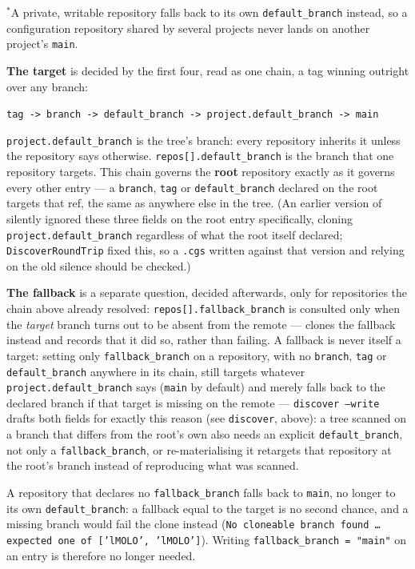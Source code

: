 ${}^{*}$A private, writable repository falls back to its own
\texttt{default\_branch} instead, so a configuration repository shared by
several projects never lands on another project's \texttt{main}.

\textbf{The target} is decided by the first four, read as one chain, a tag
winning outright over any branch:

\begin{center}
\texttt{tag -> branch -> default\_branch -> project.default\_branch -> main}
\end{center}

\texttt{project.default\_branch} is the tree's branch: every repository
inherits it unless the repository says otherwise.
\texttt{repos[].default\_branch} is the branch that one repository targets.
This chain governs the \textbf{root} repository exactly as it governs every
other entry --- a \texttt{branch}, \texttt{tag} or \texttt{default\_branch}
declared on the root targets that ref, the same as anywhere else in the
tree. (An earlier version of \cgscli{} silently ignored these three fields
on the root entry specifically, cloning \texttt{project.default\_branch}
regardless of what the root itself declared; \texttt{DiscoverRoundTrip}
fixed this, so a \texttt{.cgs} written against that version and relying on
the old silence should be checked.)

\textbf{The fallback} is a separate question, decided afterwards, only for
repositories the chain above already resolved: \texttt{repos[].fallback\_branch}
is consulted only when the \emph{target} branch turns out to be absent from
the remote --- \cgscli{} clones the fallback instead and records that it
did so, rather than failing. A fallback is never itself a target: setting
only \texttt{fallback\_branch} on a repository, with no \texttt{branch},
\texttt{tag} or \texttt{default\_branch} anywhere in its chain, still
targets whatever \texttt{project.default\_branch} says (\texttt{main} by
default) and merely falls back to the declared branch if that target is
missing on the remote --- \texttt{discover --write} drafts both fields for
exactly this reason (see \texttt{discover}, above): a tree scanned on a
branch that differs from the root's own also needs an explicit
\texttt{default\_branch}, not only a \texttt{fallback\_branch}, or
re-materialising it retargets that repository at the root's branch instead
of reproducing what was scanned.

A repository that declares no \texttt{fallback\_branch} falls back to
\texttt{main}, no longer to its own \texttt{default\_branch}: a fallback equal
to the target is no second chance, and a missing branch would fail the clone instead
(\texttt{No cloneable branch found \ldots expected one of ['lMOLO',
'lMOLO']}). Writing \texttt{fallback\_branch = "main"} on an entry is
therefore no longer needed.

